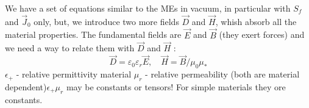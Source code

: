 \documentclass{article}
\begin{document}
We have a set of equations similar to the MEs in vacuum, in particular with $S_f$ and $\vec{J}_0$ only, but, we introduce two more fields $\vec{D}$ and $\vec{H}$, whish absorb all the material properties.
The fundamental fields are $\vec{E}$ and $\vec{B}$ (they exert forces) and we need a way to relate them with $\vec{D}$ and $\vec{H}$ :
$$
\vec{D}=\varepsilon_0 \varepsilon_r \vec{E}, \quad \vec{H}=\vec{B} / \mu_0 \mu_*
$$
$\epsilon_{+}$ - relative permittivity material $\mu_r$ - relative permeability (both are material dependent)$\epsilon_{+} \mu_r$ may be constants or tensors! For simple materials they ore constants.
\end{document}
